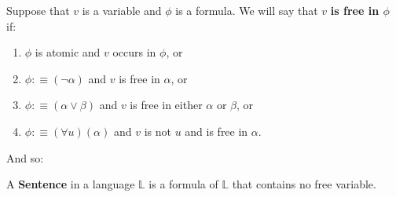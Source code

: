 \documentclass[9pt,a4paper, twocolumn]{article}
\newcommand{\curveL}{\mathbb{L} }
\begin{document}
        \begin{define}
            Suppose that $v$ is a variable and $\phi$ is a formula. We will say that $v$ \textbf{is free in $\phi$} if:
            \begin{enumerate}
                \item $\phi$ is atomic and $v$ occurs in $\phi$, or
                \item $\phi:\equiv (\neg\alpha)$ and $v$ is free in $\alpha$, or
                \item $\phi:\equiv (\alpha\lor\beta)$ and $v$ is free in either $\alpha$ or $\beta$, or
                \item $\phi:\equiv (\forall u)(\alpha)$ and $v$ is not $u$ and is free in $\alpha$.
            \end{enumerate}
        \end{define}
        And so:
        \begin{define}
            A \textbf{Sentence} in a language $\curveL$ is a formula of $\curveL$ that contains no free variable.
        \end{define}
\end{document}
